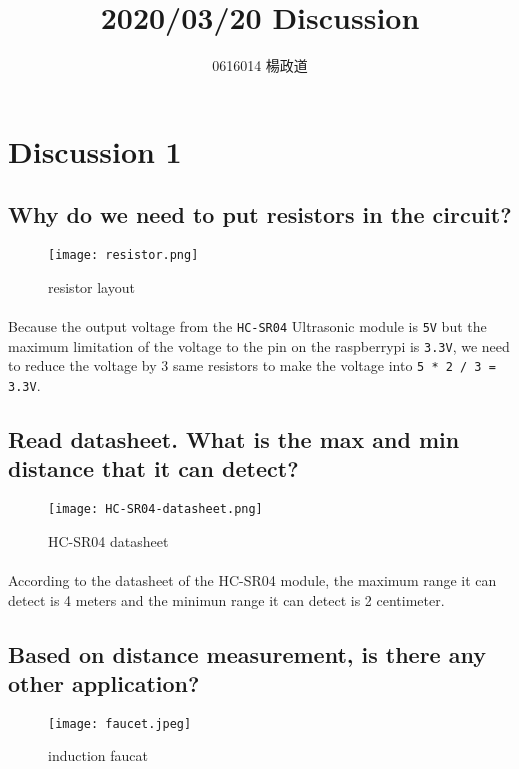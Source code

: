 \title{2020/03/20 Discussion}
\author{0616014 楊政道}
\maketitle
\thispagestyle{fancy}
\section{Discussion 1}
\subsection{Why do we need to put resistors in the circuit?}
\begin{figure}[!h]
\begin{center} 
\texttt{[image: resistor.png]} 
\caption{resistor layout}
\end{center} 
\end{figure} 
\paragraph{}
Because the output voltage from the \texttt{HC-SR04} Ultrasonic module is \texttt{5V} but the maximum limitation of the voltage to the pin on the raspberrypi is \texttt{3.3V}, we need to reduce the voltage by 3 same resistors to make the voltage into \texttt{5 * 2 / 3 = 3.3V}.
\subsection{Read datasheet. What is the max and min distance that it can detect?}
\begin{figure}[!h]
\begin{center} 
\texttt{[image: HC-SR04-datasheet.png]} 
\caption{HC-SR04 datasheet}
\end{center} 
\end{figure} 
\paragraph{}
According to the datasheet of the HC-SR04 module, the maximum range it can detect is 4 meters and the minimun range it can detect is 2 centimeter.
\subsection{Based on distance measurement, is there any other application?}
\begin{figure}[!h]
\begin{center} 
\texttt{[image: faucet.jpeg]} 
\caption{induction faucat}
\end{center} 
\end{figure} 
